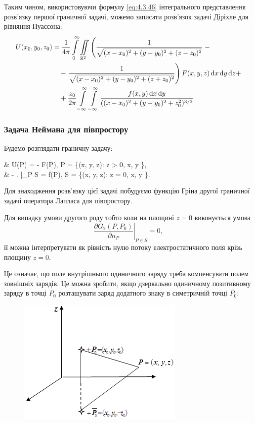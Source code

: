 Таким чином, використовуючи формулу \eqref{eq:4.3.46} інтегрального представлення розв'язку першої граничної задачі, можемо записати розв'язок задачі Діріхле для рівняння Пуассона:
\begin{equation}
	\begin{aligned}
		U(x_0, y_0, z_0) &= \frac{1}{4 \pi} \displaystyle\int\limits_0^\infty \displaystyle\iint\limits_{\mathbb{R}^2} \left( \frac{1}{\sqrt{(x - x_0)^2 + (y - y_0)^2 + (z - z_0)^2}} \right. - \\
		& \quad - \left. \frac{1}{\sqrt{(x - x_0)^2 + (y - y_0)^2 + (z + z_0)^2}} \right) F(x, y, z) \mathop{}\!\mathrm{d} x \mathop{}\!\mathrm{d} y \mathop{}\!\mathrm{d} z + \\
		& \quad + \frac{z_0}{2 \pi} \displaystyle\int\limits_{-\infty}^\infty \displaystyle\int\limits_{-\infty}^\infty \frac{f(x, y) \mathop{}\!\mathrm{d} x \mathop{}\!\mathrm{d} y}{((x - x_0)^2 + (y - y_0)^2 + z_0^2)^{3/2}}
	\end{aligned}
\end{equation}

\subsubsection{Задача Неймана для півпростору}

Будемо розглядати граничну задачу:
\begin{system}
	& \Delta U(P) = - F(P), \quad P \in \Omega = \{(x, y, z): z > 0, x, y \in \RR\}, \\
	& - \left.  \right|_{P \in S} = f(P), \quad S = \{(x, y, z): z = 0, x, y \in \RR\}.
\end{system}

Для знаходження розв'язку цієї задачі побудуємо функцію Гріна другої граничної задачі оператора Лапласа для півпростору. \medskip

Для випадку умови другого роду тобто коли на площині $z = 0$ виконується умова
\begin{equation}
	\left. \frac{\partial G_2(P, P_0)}{\partial n_P} \right|_{P \in S} = 0,
\end{equation}
її можна інтерпретувати як рівність нулю потоку електростатичного поля крізь площину $z = 0$. \medskip

Це означає, що поле внутрішнього одиничного заряду треба компенсувати полем зовнішніх зарядів. Це можна зробити, якщо дзеркально одиничному позитивному заряду в точці $P_0$ розташувати заряд додатного знаку в симетричній точці $\overline{P_0}$:
\begin{figure}[H]
	\centering
	\includegraphics[]{img/20-2.png}
\end{figure}

